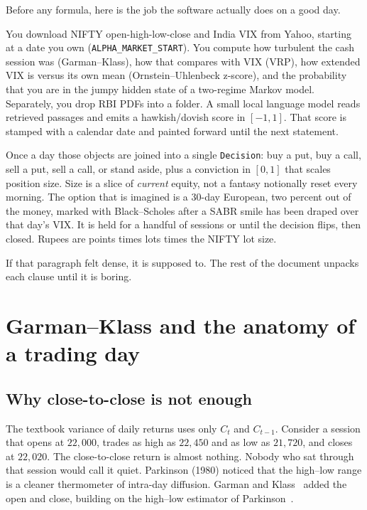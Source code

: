 \documentclass[11pt,a4paper]{article}
\begin{document}
Before any formula, here is the job the software actually does on a good day.

You download NIFTY open-high-low-close and India VIX from Yahoo, starting at a date you own (\texttt{ALPHA\_MARKET\_START}). You compute how turbulent the cash session was (Garman--Klass), how that compares with VIX (VRP), how extended VIX is versus its own mean (Ornstein--Uhlenbeck z-score), and the probability that you are in the jumpy hidden state of a two-regime Markov model. Separately, you drop RBI PDFs into a folder. A small local language model reads retrieved passages and emits a hawkish/dovish score in $[-1,1]$. That score is stamped with a calendar date and painted forward until the next statement.

Once a day those objects are joined into a single \texttt{Decision}: buy a put, buy a call, sell a put, sell a call, or stand aside, plus a conviction in $[0,1]$ that scales position size. Size is a slice of \emph{current} equity, not a fantasy notionally reset every morning. The option that is imagined is a 30-day European, two percent out of the money, marked with Black--Scholes after a SABR smile has been draped over that day's VIX. It is held for a handful of sessions or until the decision flips, then closed. Rupees are points times lots times the NIFTY lot size.

If that paragraph felt dense, it is supposed to. The rest of the document unpacks each clause until it is boring.

\section{Garman--Klass and the anatomy of a trading day}
\label{ch:gk}

\subsection{Why close-to-close is not enough}

The textbook variance of daily returns uses only $C_t$ and $C_{t-1}$. Consider a session that opens at $22{,}000$, trades as high as $22{,}450$ and as low as $21{,}720$, and closes at $22{,}020$. The close-to-close return is almost nothing. Nobody who sat through that session would call it quiet. Parkinson (1980) noticed that the high--low range is a cleaner thermometer of intra-day diffusion. Garman and Klass~\cite{garman1980} added the open and close, building on the high--low estimator of Parkinson~\cite{parkinson1980}.
\end{document}
